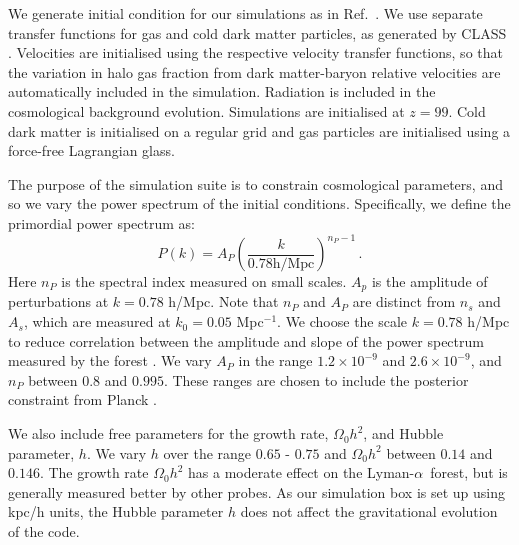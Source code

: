 \documentclass[a4paper,11pt]{article}
\newcommand{\Lya}{Lyman-$\alpha$}
\begin{document}
We generate initial condition for our simulations as in Ref.~\cite{Bird:2020}. We use separate transfer functions for gas and cold dark matter particles, as generated by CLASS \cite{CLASS}. Velocities are initialised using the respective velocity transfer functions, so that the variation in halo gas fraction from dark matter-baryon relative velocities are automatically included in the simulation. Radiation is included in the cosmological background evolution. Simulations are initialised at $z=99$. Cold dark matter is initialised on a regular grid and gas particles are initialised using a force-free Lagrangian glass.

The purpose of the simulation suite is to constrain cosmological parameters, and so we vary the power spectrum of the initial conditions. Specifically, we define the primordial power spectrum as:
\begin{equation}
 P(k) = A_P \left(\frac{k}{ 0.78 \mathrm{h/Mpc}}\right)^{n_P-1}\,.
 \label{eq:pk}
\end{equation}
Here $n_P$ is the spectral index measured on small scales. $A_p$ is the amplitude of perturbations at $k = 0.78$ h/Mpc. Note that $n_P$ and $A_P$ are distinct from $n_s$ and $A_s$, which are measured at $k_0 = 0.05$ Mpc$^{-1}$. We choose the scale $k = 0.78$ h/Mpc to reduce correlation between the amplitude and slope of the power spectrum measured by the forest \cite{Bird:2019}. We vary $A_P$ in the range $1.2 \times 10^{-9}$ and $2.6 \times 10^{-9}$, and $n_P$  between $0.8$ and $0.995$. These ranges are chosen to include the posterior constraint from Planck \cite{Planck:2018}.

We also include free parameters for the growth rate, $\Omega_0 h^2$, and Hubble parameter, $h$. We vary $h$ over the range $0.65$ - $0.75$ and $\Omega_0 h^2$ between $0.14$ and $0.146$. The growth rate $\Omega_0 h^2$ has a moderate effect on the \Lya~forest, but is generally measured better by other probes. As our simulation box is set up using kpc/h units, the Hubble parameter $h$ does not affect the gravitational evolution of the code.
\end{document}
